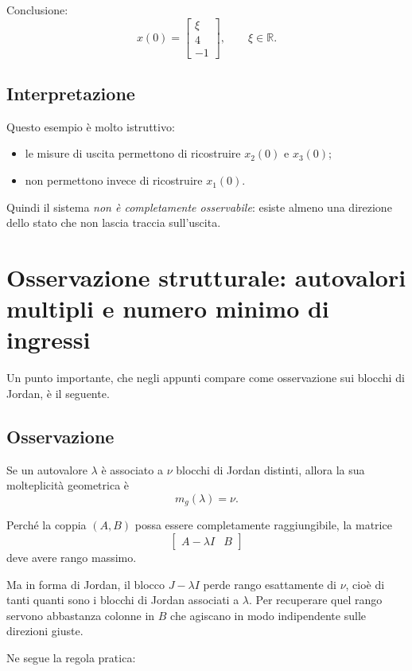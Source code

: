 Conclusione:
\[
x(0)=
\begin{bmatrix}
\xi\\
4\\
-1
\end{bmatrix},
\qquad \xi\in\mathbb R.
\]

\subsection{Interpretazione}

Questo esempio è molto istruttivo:
\begin{itemize}
    \item le misure di uscita permettono di ricostruire \(x_2(0)\) e \(x_3(0)\);
    \item non permettono invece di ricostruire \(x_1(0)\).
\end{itemize}

Quindi il sistema \emph{non è completamente osservabile}: esiste almeno una direzione dello stato che non lascia traccia sull’uscita.

\section{Osservazione strutturale: autovalori multipli e numero minimo di ingressi}

Un punto importante, che negli appunti compare come osservazione sui blocchi di Jordan, è il seguente.

\subsection*{Osservazione}
Se un autovalore \(\lambda\) è associato a \(\nu\) blocchi di Jordan distinti, allora la sua molteplicità geometrica è
\[
m_g(\lambda)=\nu.
\]

Perché la coppia \((A,B)\) possa essere completamente raggiungibile, la matrice
\[
\begin{bmatrix}
A-\lambda I & B
\end{bmatrix}
\]
deve avere rango massimo.

Ma in forma di Jordan, il blocco \(J-\lambda I\) perde rango esattamente di \(\nu\), cioè di tanti quanti sono i blocchi di Jordan associati a \(\lambda\). Per recuperare quel rango servono abbastanza colonne in \(B\) che agiscano in modo indipendente sulle direzioni giuste.

Ne segue la regola pratica:


